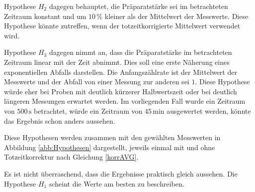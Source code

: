 \documentclass[12pt,a4paper]{scrartcl}
\numberwithin{equation}{section} %
\begin{document}
Hypothese $H_2$ dagegen behauptet, die Präparatstärke sei im betrachteten Zeitraum konstant und um $10\,\%$ kleiner als der Mittelwert der Messwerte. Diese Hypothese könnte zutreffen, wenn der totzeitkorrigierte Mittelwert verwendet wird.

Hypothese $H_3$ dagegen nimmt an, dass die Präparatstärke im betrachteten Zeitraum linear mit der Zeit abnimmt. Dies soll eine erste Näherung eines exponentiellen Abfalls darstellen. Die Anfangszählrate ist der Mittelwert der Messwerte und der Abfall von einer Messung zur anderen sei $1$. Diese Hypothese würde eher bei Proben mit deutlich kürzerer Halbwertszeit oder bei deutlich längeren Messungen erwartet werden. Im vorliegenden Fall wurde ein Zeitraum von $500\mathrm{\,s}$ betrachtet, würde ein Zeitraum von $45\mathrm{\,min}$ ausgewertet werden, könnte das Ergebnis schon anders aussehen.

Diese Hypothesen werden zusammen mit den gewählten Messwerten in Abbildung \ref{abb:Hypothesen} dargestellt, jeweils einmal mit und ohne Totzeitkorrektur nach Gleichung \eqref{korrAVG}.

Es ist nicht überraschend, dass die Ergebnisse praktisch gleich aussehen. Die Hypothese $H_1$ scheint die Werte am besten zu beschreiben.
\end{document}
